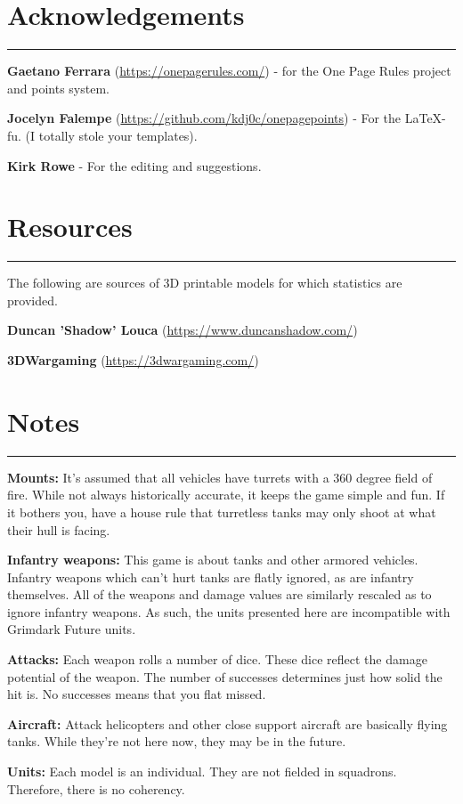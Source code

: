 \documentclass[11pt]{article}
\newcommand{\mysection}[1]{
  \section*{\centering #1}
  \raggedright
  \hrule
  \bigskip

}
\renewenvironment{description}
  {\list{}{\labelwidth=0pt \leftmargin=0pt
   \let\makelabel\descriptionlabel}}
  {\endlist}
\begin{document}
\begin{multicols*}{2}[]
\raggedcolumns

\mysection{Acknowledgements}

\begin{description}
\item {\bf Gaetano Ferrara}
  ({\footnotesize\url{https://onepagerules.com/}}) - for
  the One Page Rules project and points system.
\item {\bf Jocelyn Falempe}
  ({\footnotesize\url{https://github.com/kdj0c/onepagepoints}}) -
For the \LaTeX-fu. (I totally stole your templates).
\item {\bf Kirk Rowe} - For the editing and suggestions.
\end{description}

\mysection{Resources}

The following are sources of 3D printable models for which statistics
are provided.

\begin{description}
\item {\bf Duncan 'Shadow' Louca}
  ({\footnotesize\url{https://www.duncanshadow.com/}})
\item {\bf 3DWargaming} ({\footnotesize\url{https://3dwargaming.com/}})
\end{description}

\mysection{Notes}

\begin{description}
\item{\bf Mounts:} It’s assumed that all vehicles have turrets with a 360
  degree field of fire. While not always historically accurate, it
  keeps the game simple and fun. If it bothers you, have a house rule
  that turretless tanks may only shoot at what their hull is facing.
\item{\bf Infantry weapons:} This game is about tanks and other armored
  vehicles. Infantry weapons which can’t hurt tanks are flatly
  ignored, as are infantry themselves. All of the weapons and damage
  values are similarly rescaled as to ignore infantry weapons. As
  such, the units presented here are incompatible with Grimdark Future
  units.
\item{\bf Attacks:} Each weapon rolls a number of dice. These dice reflect
  the damage potential of the weapon. The number of successes
  determines just how solid the hit is. No successes means that you
  flat missed.
\item{\bf Aircraft:} Attack helicopters and other close support aircraft
  are basically flying tanks. While they’re not here now, they may be
  in the future.
\item{\bf Units:} Each model is an individual. They are not fielded in
  squadrons. Therefore, there is no coherency.


\end{description}
\end{multicols*}
\end{document}
